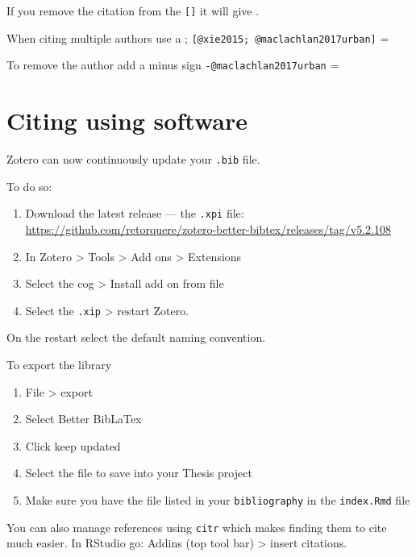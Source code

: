 \documentclass[
  12pt,
  oneside]{book}
\providecommand{\tightlist}{%
  \setlength{\itemsep}{0pt}\setlength{\parskip}{0pt}}
\begin{document}
If you remove the citation from the \texttt{{[}{]}} it will give \textcite{xie2015}.

When citing multiple authors use a ; \texttt{{[}@xie2015;\ @maclachlan2017urban{]}} = \autocite{xie2015,maclachlan2017urban}

To remove the author add a minus sign \texttt{-@maclachlan2017urban} = \autocite*{maclachlan2017urban}

\hypertarget{citing-using-software}{%
\section{Citing using software}\label{citing-using-software}}

Zotero can now continuously update your \texttt{.bib} file.

To do so:

\begin{enumerate}
\def\labelenumi{\arabic{enumi}.}
\item
  Download the latest release --- the \texttt{.xpi} file: \url{https://github.com/retorquere/zotero-better-bibtex/releases/tag/v5.2.108}
\item
  In Zotero \textgreater{} Tools \textgreater{} Add ons \textgreater{} Extensions
\item
  Select the cog \textgreater{} Install add on from file
\item
  Select the \texttt{.xip} \textgreater{} restart Zotero.
\end{enumerate}

On the restart select the default naming convention.

To export the library

\begin{enumerate}
\def\labelenumi{\arabic{enumi}.}
\tightlist
\item
  File \textgreater{} export
\item
  Select Better BibLaTex
\item
  Click keep updated
\item
  Select the file to save into your Thesis project
\item
  Make sure you have the file listed in your \texttt{bibliography} in the \texttt{index.Rmd} file
\end{enumerate}

You can also manage references using \texttt{citr} which makes finding them to cite much easier. In RStudio go: Addins (top tool bar) \textgreater{} insert citations.
\end{document}
